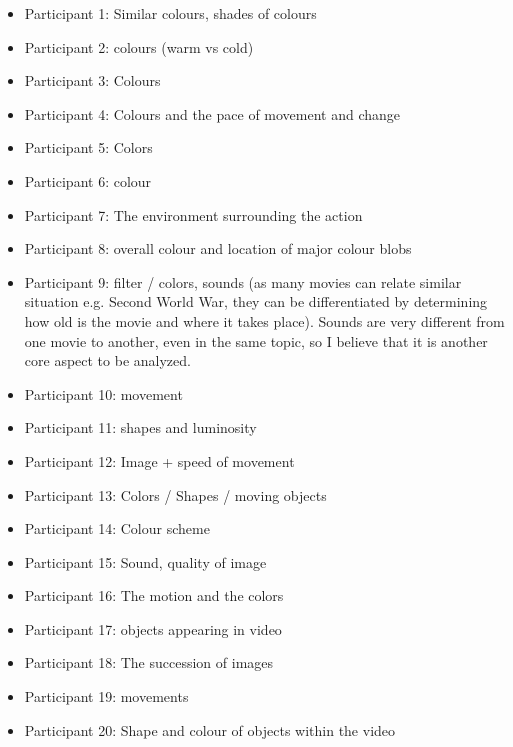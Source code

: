 \begin{itemize}
	\item Participant 1: Similar colours, shades of colours
    \item Participant 2: colours (warm vs cold) 
    \item Participant 3: Colours 
    \item Participant 4: Colours and the pace of movement and change
    \item Participant 5: Colors
    \item Participant 6: colour
    \item Participant 7: The environment surrounding the action
    \item Participant 8: overall colour and location of major colour blobs
    \item Participant 9: filter / colors, sounds (as many movies can relate similar situation e.g. Second World War, they can be differentiated by determining how old is the movie and where it takes place). Sounds are very different from one movie to another, even in the same topic, so I believe that it is another core aspect to be analyzed.
    \item Participant 10: movement 
    \item Participant 11: shapes and luminosity 
    \item Participant 12: Image + speed of movement 
    \item Participant 13: Colors / Shapes / moving objects
    \item Participant 14: Colour scheme
    \item Participant 15: Sound, quality of image
    \item Participant 16: The motion and the colors
    \item Participant 17: objects appearing in video
    \item Participant 18: The succession of images
    \item Participant 19: movements
    \item Participant 20: Shape and colour of objects within the video
\end{itemize}
